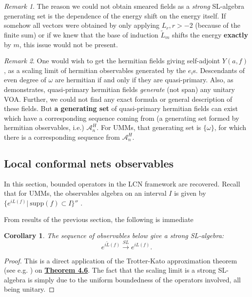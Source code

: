 \documentclass[twoside,11pt,titlepage]{amsart}
\renewcommand{\=}[1]{\stackrel{#1}{=}} %
\newtheorem{cor}[thm]{Corollary}
\theoremstyle{definition}
\theoremstyle{remark}
\newtheorem{rmk}{Remark}
\begin{document}
\begin{rmk}\label{rmk11}
The reason we could not obtain smeared fields as a \textit{strong} SL-algebra generating set is the dependence of the energy shift on the energy itself. If somehow all vectors were obtained by only applying $L_r, r > -2$ (because of the finite sum) or if we knew that the base of induction $\widetilde{L}_m$ shifts the energy \textbf{exactly} by $m$, this issue would not be present.
\end{rmk}
\begin{rmk}\label{rmk12}
One would wish to get the hermitian fields giving self-adjoint $Y(a,f)$, as a scaling limit of hermitian observables generated by the $e_i$s. Descendants of even degree of $\omega$ are hermitian if and only if they are quasi-primary. Also, as \cite{carpi2015vertex} demonstrates, quasi-primary hermitian fields \textit{generate} (not span) any unitary VOA. Further, we could not find any exact formula or general description of these fields. But \textbf{a generating set} of quasi-primary hermitian fields can exist which have a corresponding sequence coming from (a generating set formed by hermitian observables, i.e.) $\mathcal{A}_n^H$. For UMMs, that generating set is $\{\omega\}$, for which there is a corresponding sequence from $\mathcal{A}_n^H$.
\end{rmk}


\subsection{Local conformal nets observables}\label{4.2}

\hfill \break
In this section, bounded operators in the LCN framework are recovered. Recall that for UMMs, the observables algebra on an interval $I$ is given by $\{e^{iL(f)}| \ \text{supp}(f) \subset I \}''$ \cite{kawahigashi2004classification}.

From results of the previous section, the following is immediate
\begin{cor}\label{cor4.9} 
The sequence of observables below give a strong SL-algebra:
$$e^{i\widetilde{L}(f)} \xrightarrow{SL} e^{iL(f)}.$$
\end{cor}
\begin{proof}
This is a direct application of the Trotter-Kato approximation theorem (see e.g. \cite{engel2006short}) on \hyperref[thm4.6]{\textbf{Theorem 4.6}}. The fact that the scaling limit is a strong SL-algebra is simply due to the uniform boundedness of the operators involved, all being unitary.
\end{proof}
\end{document}
